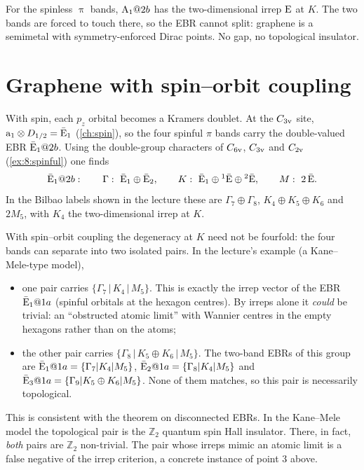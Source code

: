 For the spinless $\uppi$ bands, $\mathrm{A}_1@2b$ has the two-dimensional irrep $\mathrm{E}$ at $K$.
The two bands are forced to touch there, so the EBR cannot split: graphene is a
semimetal with symmetry-enforced Dirac points. No gap, no topological insulator.

\section{Graphene with spin--orbit coupling}

With spin, each $p_z$ orbital becomes a Kramers doublet. At the $C_{3\mathrm{v}}$ site,
$\mathrm{a}_1\otimes D_{1/2}=\bar{\mathrm{E}}_1$ (\cref{ch:spin}), so the four spinful $\pi$
bands carry the double-valued EBR $\bar{\mathrm{E}}_1@2b$. Using the double-group
characters of $C_{6\mathrm{v}}$, $C_{3\mathrm{v}}$ and $C_{2\mathrm{v}}$ (\cref{ex:8:spinful}) one finds
\begin{equation}\label{eq:spinfulgraphene}
\bar{\irr{E}}_1@2b:\qquad
\Gamma:\ \bar{\irr{E}}_1\oplus\bar{\irr{E}}_2,\qquad
K:\ \bar{\irr{E}}_1\oplus{}^{1}\bar{\irr{E}}\oplus{}^{2}\bar{\irr{E}},\qquad
M:\ 2\,\bar{\irr{E}} .
\end{equation}
In the Bilbao labels shown in the lecture these are
$\Gamma_7\oplus\Gamma_8$, $K_4\oplus K_5\oplus K_6$ and $2M_5$, with $K_4$ the
two-dimensional irrep at $K$.

With spin--orbit coupling the degeneracy at $K$ need not be fourfold: the four bands can
separate into two isolated pairs. In the lecture's example (a Kane--Mele-type model),
\begin{itemize}
\item one pair carries $\{\Gamma_7\,|\,K_4\,|\,M_5\}$. This is exactly the irrep vector of
      the EBR $\bar{\mathrm{E}}_1@1a$ (spinful orbitals at the hexagon centres). By irreps
      alone it \emph{could} be trivial: an ``obstructed atomic limit'' with Wannier
      centres in the empty hexagons rather than on the atoms;
\item the other pair carries $\{\Gamma_8\,|\,K_5\oplus K_6\,|\,M_5\}$. The two-band EBRs
      of this group are $\bar{\mathrm{E}}_1@1a=\{\Gamma_7|K_4|M_5\}$,
      $\bar{\mathrm{E}}_2@1a=\{\Gamma_8|K_4|M_5\}$ and $\bar{\mathrm{E}}_3@1a=\{\Gamma_9|K_5\oplus K_6|M_5\}$.
      None of them matches, so this pair is necessarily topological.
\end{itemize}
This is consistent with the theorem on disconnected EBRs. In the Kane--Mele model the
topological pair is the $\mathbb{Z}_2$ quantum spin Hall insulator. There, in fact,
\emph{both} pairs are $\mathbb{Z}_2$ non-trivial. The pair whose irreps mimic an atomic
limit is a false negative of the irrep criterion, a concrete instance of point 3 above.

